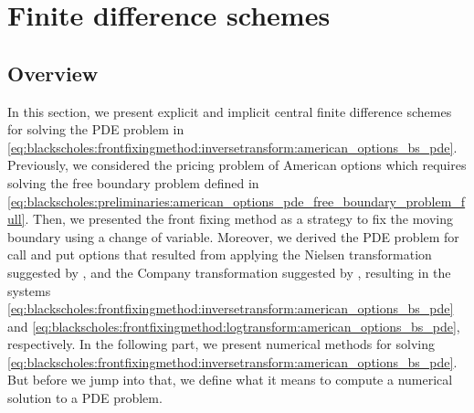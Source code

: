 \section{Finite difference schemes} \label{sec:finitedifferencesschemes}
\subsection{Overview}

In this section, we present explicit and implicit central finite difference schemes for solving the PDE problem in \eqref{eq:blackscholes:frontfixingmethod:inversetransform:american_options_bs_pde}. Previously, we considered the pricing problem of American options which requires solving the free boundary problem defined in \eqref{eq:blackscholes:preliminaries:american_options_pde_free_boundary_problem_full}.
Then, we presented the front fixing method as a strategy to fix the moving boundary using a change of variable. Moreover, we derived the PDE problem for call and put options that resulted from applying the Nielsen transformation suggested by \cite{nielsen_2001}, and the Company transformation suggested by \cite{company_egorova_jodar_2014}, resulting in the systems \eqref{eq:blackscholes:frontfixingmethod:inversetransform:american_options_bs_pde} and \eqref{eq:blackscholes:frontfixingmethod:logtransform:american_options_bs_pde}, respectively. In the following part, we present numerical methods for solving \eqref{eq:blackscholes:frontfixingmethod:inversetransform:american_options_bs_pde}. But before we jump into that, we define what it means to compute a numerical solution to a PDE problem.

